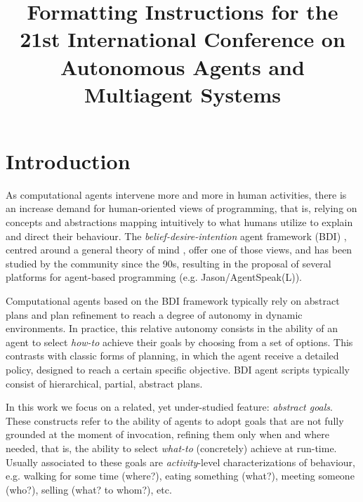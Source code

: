 \documentclass[sigconf,anonymous]{aamas}
\title[AAMAS-2022 Formatting Instructions]{Formatting Instructions for the 21st International Conference on Autonomous Agents and Multiagent Systems}
\begin{document}

\pagestyle{fancy}
\fancyhead{}


\maketitle 


\section{Introduction}

As computational agents intervene more and more in human activities, there is an increase demand for human-oriented views of programming, that is, relying on concepts and abstractions mapping intuitively to what humans utilize to explain and direct their behaviour. The \textit{belief-desire-intention} agent framework (BDI) \cite{Rao1995}, centred around a general theory of mind \cite{bratman1987intention}, offer one of those views, and has been studied by the community since the 90s, resulting in the proposal of several platforms for agent-based programming (e.g. Jason/AgentSpeak(L)).

Computational agents based on the BDI framework typically rely on abstract plans and plan refinement to reach a degree of autonomy in dynamic environments. In practice, this relative autonomy consists in the ability of an agent to select \textit{how-to} achieve their goals by choosing from a set of options. This contrasts with classic forms of planning, in which the agent receive a detailed policy, designed to reach a certain specific objective. BDI agent scripts typically consist of hierarchical, partial, abstract plans.  

In this work we focus on a related, yet under-studied feature: %
\textit{abstract goals}. These constructs refer to the ability of agents to adopt goals that are not fully grounded at the moment of invocation, refining them only when and where needed, that is, the ability to select \textit{what-to} (concretely) achieve at run-time. Usually associated to these goals are \textit{activity}-level characterizations of behaviour, e.g. walking for some time (where?), eating something (what?), meeting someone (who?), selling (what? to whom?), etc. 
\end{document}
